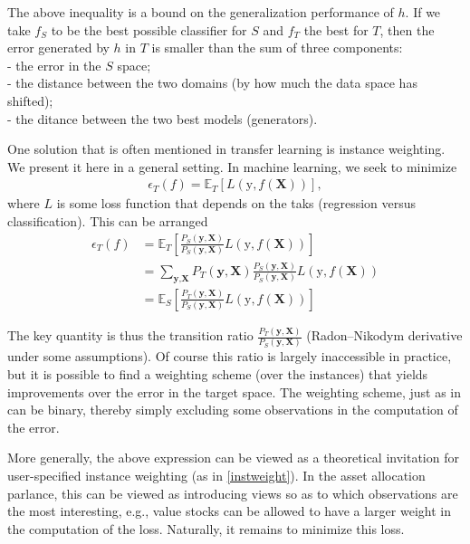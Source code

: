 \documentclass[]{krantz}
\theoremstyle{definition}
\theoremstyle{definition}
\theoremstyle{definition}
\theoremstyle{remark}
\begin{document}
The above inequality is a bound on the generalization performance of
\(h\). If we take \(f_S\) to be the best possible classifier for \(S\)
and \(f_T\) the best for \(T\), then the error generated by \(h\) in
\(T\) is smaller than the sum of three components:\\
- the error in the \(S\) space;\\
- the distance between the two domains (by how much the data space has
shifted);\\
- the ditance between the two best models (generators).

One solution that is often mentioned in transfer learning is instance
weighting. We present it here in a general setting. In machine learning,
we seek to minimize \begin{align*}
\epsilon_T(f)=\mathbb{E}_T\left[L(\text{y},f(\textbf{X})) \right],
\end{align*} where \(L\) is some loss function that depends on the taks
(regression versus classification). This can be arranged \begin{align*}
\epsilon_T(f)&=\mathbb{E}_T \left[\frac{P_S(\textbf{y},\textbf{X})}{P_S(\textbf{y},\textbf{X})} L(\text{y},f(\textbf{X})) \right]  \\
&=\sum_{\textbf{y},\textbf{X}}P_T(\textbf{y},\textbf{X})\frac{P_S(\textbf{y},\textbf{X})}{P_S(\textbf{y},\textbf{X})} L(\text{y},f(\textbf{X})) \\
&=\mathbb{E}_S \left[\frac{P_T(\textbf{y},\textbf{X})}{P_S(\textbf{y},\textbf{X})} L(\text{y},f(\textbf{X})) \right]
\end{align*}

The key quantity is thus the transition ratio
\(\frac{P_T(\textbf{y},\textbf{X})}{P_S(\textbf{y},\textbf{X})}\)
(Radon--Nikodym derivative under some assumptions). Of course this ratio
is largely inaccessible in practice, but it is possible to find a
weighting scheme (over the instances) that yields improvements over the
error in the target space. The weighting scheme, just as in
\citet{coqueret2019training} can be binary, thereby simply excluding
some observations in the computation of the error.

More generally, the above expression can be viewed as a theoretical
invitation for user-specified instance weighting (as in
\ref{instweight}). In the asset allocation parlance, this can be viewed
as introducing views so as to which observations are the most
interesting, e.g., value stocks can be allowed to have a larger weight
in the computation of the loss. Naturally, it remains to minimize this
loss.
\end{document}
